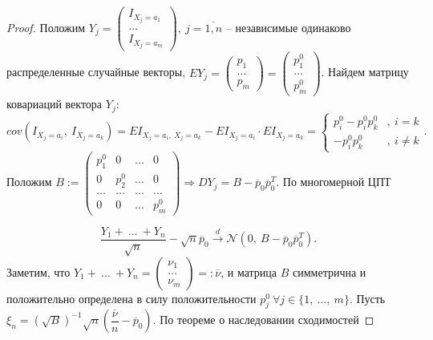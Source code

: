 \begin{proof}
    Положим $\displaystyle Y_{j} =\begin{pmatrix}
    I_{X_{j} =a_{1}}\\
    \dotsc \\
    I_{X_{j} =a_{m}}
    \end{pmatrix} ,\ j=\overline{1,n}$ -- независимые одинаково распределенные случайные векторы, $\displaystyle EY_{j} =\begin{pmatrix}
    p_{1}\\
    \dotsc \\
    p_{m}
    \end{pmatrix} =\begin{pmatrix}
    p_{1}^{0}\\
    \dotsc \\
    p_{m}^{0}
    \end{pmatrix}$. Найдем матрицу ковариаций вектора $\displaystyle Y_{j}$:
    \begin{equation*}
        cov( I_{X_{j} =a_{i}} ,\ I_{X_{j} =a_{k}}) =EI_{X_{j} =a_{i} ,\ X_{j} =a_{k}} -EI_{X_{j} =a_{i}} \cdotp EI_{X_{j} =a_{k}} =\begin{cases}
        p_{i}^{0} -p_{i}^{0} p_{k}^{0} & ,\ i=k\\
        -p_{i}^{0} p_{k}^{0} & ,\ i\neq k
        \end{cases} .
    \end{equation*}
    Положим $\displaystyle B:=\begin{pmatrix}
    p_{1}^{0} & 0 & \dotsc  & 0\\
    0 & p_{2}^{0} & \dotsc  & 0\\
    \dotsc  & \dotsc  & \dotsc  & \dotsc \\
    0 & 0 & \dotsc  & p_{m}^{0}
    \end{pmatrix} \Rightarrow DY_{j} =B-\overline{p}_{0}\overline{p}_{0}^{T}$. По многомерной ЦПТ
    
    
    \begin{equation*}
        \dfrac{Y_{1} +\ \dotsc \ +Y_{n}}{\sqrt{n}} -\sqrt{n}\overline{p}_{0}\xrightarrow{d}\mathcal{N}\left( 0,\ B-\overline{p}_{0}\overline{p}_{0}^{T}\right) .
    \end{equation*}
    Заметим, что $\displaystyle Y_{1} +\ \dotsc \ +Y_{n} =\begin{pmatrix}
    \nu _{1}\\
    \dotsc \\
    \nu _{m}
    \end{pmatrix} =:\overline{\nu }$, и матрица $\displaystyle B$ симметрична и положительно определена в силу положительности $\displaystyle p_{j}^{0} \ \forall j\in \{1,\ \dotsc ,\ m\}$. Пусть $\displaystyle \xi _{n} =\left(\sqrt{B}\right)^{-1}\sqrt{n}\left(\dfrac{\overline{\nu }}{n} -\overline{p}_{0}\right)$. По теореме о наследовании сходимостей
    

\end{proof}
